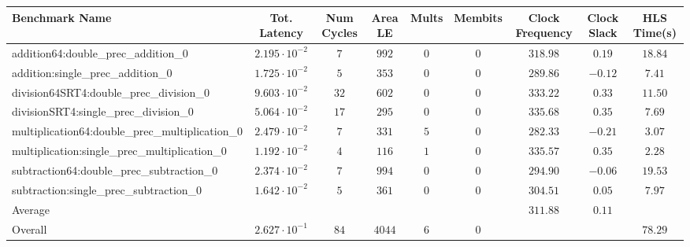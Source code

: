 \begin{tabular}{|l|c|c|c|c|c|c|c|c|}
\hline
Benchmark Name                                   & Tot. Latency            & Num Cycles & Area LE  & Mults & Membits & Clock Frequency & Clock Slack & HLS Time(s) \\
\hline
addition64:double\_prec\_addition\_0             & $ 2.195 \cdot 10^{-2} $ & $ 7      $ & $ 992  $ & $ 0 $ & $ 0   $ & $ 318.98      $ & $ 0.19    $ & $ 18.84   $ \\
addition:single\_prec\_addition\_0               & $ 1.725 \cdot 10^{-2} $ & $ 5      $ & $ 353  $ & $ 0 $ & $ 0   $ & $ 289.86      $ & $ -0.12   $ & $ 7.41    $ \\
division64SRT4:double\_prec\_division\_0         & $ 9.603 \cdot 10^{-2} $ & $ 32     $ & $ 602  $ & $ 0 $ & $ 0   $ & $ 333.22      $ & $ 0.33    $ & $ 11.50   $ \\
divisionSRT4:single\_prec\_division\_0           & $ 5.064 \cdot 10^{-2} $ & $ 17     $ & $ 295  $ & $ 0 $ & $ 0   $ & $ 335.68      $ & $ 0.35    $ & $ 7.69    $ \\
multiplication64:double\_prec\_multiplication\_0 & $ 2.479 \cdot 10^{-2} $ & $ 7      $ & $ 331  $ & $ 5 $ & $ 0   $ & $ 282.33      $ & $ -0.21   $ & $ 3.07    $ \\
multiplication:single\_prec\_multiplication\_0   & $ 1.192 \cdot 10^{-2} $ & $ 4      $ & $ 116  $ & $ 1 $ & $ 0   $ & $ 335.57      $ & $ 0.35    $ & $ 2.28    $ \\
subtraction64:double\_prec\_subtraction\_0       & $ 2.374 \cdot 10^{-2} $ & $ 7      $ & $ 994  $ & $ 0 $ & $ 0   $ & $ 294.90      $ & $ -0.06   $ & $ 19.53   $ \\
subtraction:single\_prec\_subtraction\_0         & $ 1.642 \cdot 10^{-2} $ & $ 5      $ & $ 361  $ & $ 0 $ & $ 0   $ & $ 304.51      $ & $ 0.05    $ & $ 7.97    $ \\
\hline
Average                                          & $                     $ & $        $ & $      $ & $   $ & $     $ & $ 311.88      $ & $ 0.11    $ & $         $ \\
\hline
Overall                                          & $ 2.627 \cdot 10^{-1} $ & $ 84     $ & $ 4044 $ & $ 6 $ & $ 0   $ & $             $ & $         $ & $ 78.29   $ \\
\hline
\end{tabular}
